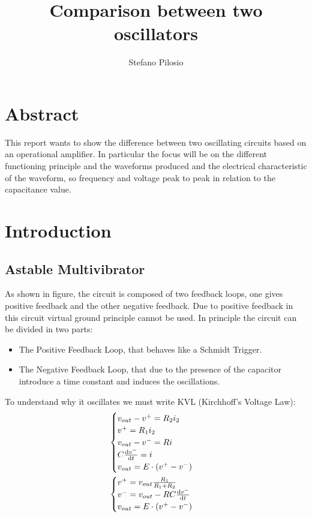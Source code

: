 \documentclass[a4paper, twocolumn]{article}
\begin{document}
\title{Comparison between two oscillators}
\author{Stefano Pilosio}

\maketitle

\section{Abstract}

This report wants to show the difference between two oscillating circuits based on an operational amplifier. In particular the focus will be on the different functioning principle and the waveforms produced and the electrical characteristic of the waveform, so frequency and voltage peak to peak in relation to the capacitance value.

\section{Introduction}

\subsection{Astable Multivibrator}


\begin{center}
    \centering
    \def \svgwidth{0.95\columnwidth}
    
\end{center}

As shown in figure, the circuit is composed of two feedback loops, one gives positive feedback and the other negative feedback. Due to positive feedback in this circuit virtual ground principle cannot be used. In principle the circuit can be divided in two parts:

\begin{itemize}
    \item The Positive Feedback Loop, that behaves like a Schmidt Trigger.
    \item The Negative Feedback Loop, that due to the presence of the capacitor introduce a time constant and induces the oscillations.
\end{itemize}

To understand why it oscillates we must write KVL (Kirchhoff's Voltage Law):
\begin{gather}
    \begin{cases}
        v_{out} - v^+ = R_2i_2\\
        v^+= R_1i_2\\
        v_{out}-v^- = R i\\
        C\dv{v^-}{t}= i\\
        v_{out} = E \cdot (v^+-v^-)
    \end{cases}\\
    \begin{cases}
        \label{eq:genStable}
        v^+=v_{out}\frac{R_1}{R_1+R_2}\\
        v^-=v_{out}-RC\dv{v^-}{t}\\
        v_{out} = E \cdot (v^+-v^-)
    \end{cases}
\end{gather}
\end{document}
